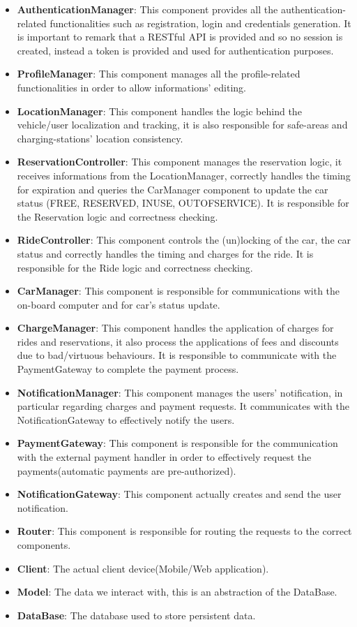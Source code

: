 \begin{itemize}
	\item \textbf{AuthenticationManager}: This component provides all the authentication-related functionalities such as registration, login and credentials generation. It is important to remark that a RESTful API is provided and so no session is created, instead a token is provided and used for authentication purposes.
	\item \textbf{ProfileManager}: This component manages all the profile-related functionalities in order to allow informations' editing.
	\item \textbf{LocationManager}: This component handles the logic behind the vehicle/user localization and tracking, it is also responsible for safe-areas and charging-stations' location consistency.
	\item \textbf{ReservationController}: This component manages the reservation logic, it receives informations from the LocationManager, correctly handles the timing for expiration and queries the CarManager component to update the car status (FREE, RESERVED, INUSE, OUTOFSERVICE). It is responsible for the Reservation logic and correctness checking.
	\item \textbf{RideController}: This component controls the (un)locking of the car, the car status and correctly handles the timing and charges for the ride. It is responsible for the Ride logic and correctness checking.
	\item \textbf{CarManager}: This component is responsible for communications with the on-board computer and for car's status update.
	\item \textbf{ChargeManager}: This component handles the application of charges for rides and reservations, it also process the applications of fees and discounts due to bad/virtuous behaviours. It is responsible to communicate with the PaymentGateway to complete the payment process.
	\item \textbf{NotificationManager}: This component manages the users' notification, in particular regarding charges and payment requests. It communicates with the NotificationGateway to effectively notify the users.
	\item \textbf{PaymentGateway}: This component is responsible for the communication with the external payment handler in order to effectively request the payments(automatic payments are pre-authorized).
	\item \textbf{NotificationGateway}: This component actually creates and send the user notification.
	\item \textbf{Router}: This component is responsible for routing the requests to the correct components.
	\item \textbf{Client}: The actual client device(Mobile/Web application).
	\item \textbf{Model}: The data we interact with, this is an abstraction of the DataBase.
	\item \textbf{DataBase}: The database used to store persistent data.
\end{itemize}

